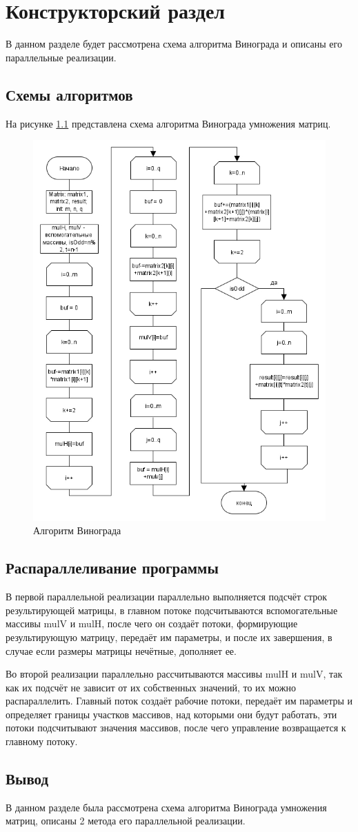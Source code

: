 \chapter{Конструкторский раздел}
\label{cha:design}
В данном разделе будет рассмотрена схема алгоритма Винограда и описаны его параллельные реализации.

\section{Схемы алгоритмов}
\label{sec:schemes}
На рисунке \ref{fig:winograd} представлена схема алгоритма Винограда умножения матриц.
\begin{figure}
	\centering
	\includegraphics[width=0.8\linewidth]{src/winograd}
	\caption[Алгоритм Винограда]{Алгоритм Винограда}
	\label{fig:winograd}
\end{figure}

\section{Распараллеливание программы}
В первой параллельной реализации параллельно выполняется подсчёт строк результирующей матрицы, в главном потоке подсчитываются вспомогательные массивы mulV и mulH, после чего он создаёт потоки, формирующие результирующую матрицу, передаёт им параметры, и после их завершения, в случае если размеры матрицы нечётные, дополняет ее.
\par Во второй реализации параллельно рассчитываются массивы mulH и mulV, так как их подсчёт не зависит от их собственных значений, то их можно распараллелить. Главный поток создаёт рабочие потоки, передаёт им параметры и определяет границы участков массивов, над которыми они будут работать, эти потоки подсчитывают значения массивов, после чего управление возвращается к главному потоку.

\section{Вывод}
\label{sec:design_conclusion}
В данном разделе была рассмотрена схема алгоритма Винограда умножения матриц, описаны 2 метода его параллельной реализации.